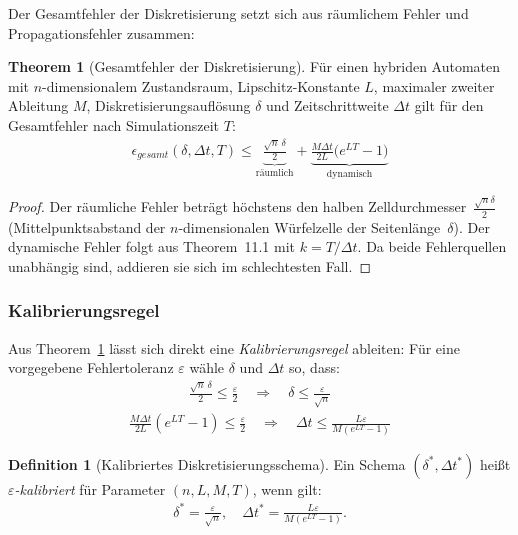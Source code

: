 ﻿\documentclass[a4paper,12pt]{article}
\theoremstyle{definition}
\newtheorem{definition}{Definition}[section]
\newtheorem{theorem}{Theorem}[section]
\begin{document}
Der Gesamtfehler der Diskretisierung setzt sich aus räumlichem Fehler und Propagationsfehler zusammen:

\begin{theorem}[Gesamtfehler der Diskretisierung]
\label{thm:gesamtfehler}
Für einen hybriden Automaten mit $n$-dimensionalem Zustandsraum, Lipschitz-Konstante $L$, maximaler zweiter Ableitung $M$, Diskretisierungsauflösung $\delta$ und Zeitschrittweite $\Delta t$ gilt für den Gesamtfehler nach Simulationszeit $T$:
\begin{align}
  \epsilon_{\mathit{gesamt}}(\delta, \Delta t, T) \leq \underbrace{\frac{\sqrt{n}\,\delta}{2}}_{\text{räumlich}} + \underbrace{\frac{M\Delta t}{2L}\bigl(e^{LT} - 1\bigr)}_{\text{dynamisch}}
\end{align}
\end{theorem}

\begin{proof}
Der räumliche Fehler beträgt höchstens den halben Zelldurchmesser~$\frac{\sqrt{n}\delta}{2}$ (Mittelpunktsabstand der $n$-di\-men\-sio\-na\-len Würfelzelle der Seitenlänge~$\delta$). Der dynamische Fehler folgt aus Theorem~11.1 mit $k = T/\Delta t$. Da beide Fehlerquellen unabhängig sind, addieren sie sich im schlechtesten Fall.
\end{proof}

\subsubsection{Kalibrierungsregel}

Aus Theorem~\ref{thm:gesamtfehler} lässt sich direkt eine \emph{Kalibrierungsregel} ableiten: Für eine vorgegebene Fehlertoleranz $\varepsilon$ wähle $\delta$ und $\Delta t$ so, dass:
\begin{align}
  \frac{\sqrt{n}\,\delta}{2} \leq \frac{\varepsilon}{2} \quad \Rightarrow \quad \delta \leq \frac{\varepsilon}{\sqrt{n}}
  \label{eq:kalibrierung_raeumlich}
\end{align}
\begin{align}
  \frac{M\Delta t}{2L}(e^{LT}-1) \leq \frac{\varepsilon}{2} \quad \Rightarrow \quad \Delta t \leq \frac{L\varepsilon}{M(e^{LT}-1)}
  \label{eq:kalibrierung_dynamisch}
\end{align}

\begin{definition}[Kalibriertes Diskretisierungsschema]
Ein Schema $(\delta^*, \Delta t^*)$ heißt \emph{$\varepsilon$-kalibriert} für Parameter $(n, L, M, T)$, wenn gilt:
\begin{align}
  \delta^* = \frac{\varepsilon}{\sqrt{n}}, \quad \Delta t^* = \frac{L\varepsilon}{M(e^{LT}-1)}.
\end{align}
\end{definition}
\end{document}
